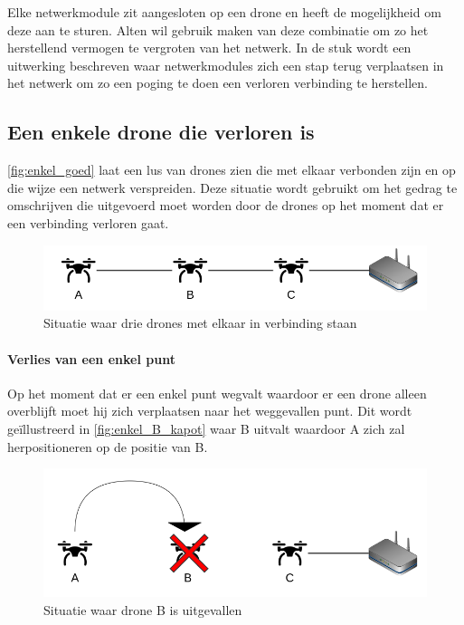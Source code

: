 \documentclass[a4paper, 11pt, oneside]{report}
\begin{document}
Elke netwerkmodule zit aangesloten op een drone en heeft de mogelijkheid om deze aan te sturen.
Alten wil gebruik maken van deze combinatie om zo het herstellend vermogen te vergroten van het netwerk.
In de stuk wordt een uitwerking beschreven waar netwerkmodules zich een stap terug verplaatsen in het netwerk om zo een poging te doen een verloren verbinding te herstellen.

\subsection{Een enkele drone die verloren is}\label{sec:een-enkele-drone-die-verloren-is}
\autoref{fig:enkel_goed} laat een lus van drones zien die met elkaar verbonden zijn en op die wijze een netwerk verspreiden. Deze situatie wordt gebruikt om het gedrag te omschrijven die uitgevoerd moet worden door de drones op het moment dat er een verbinding verloren gaat. 
\begin{figure}[H]
	\begin{center}\includegraphics[width=.85\linewidth]{Afbeeldingen/droneopstelling_enkel_goed.png}\end{center}
	\caption{Situatie waar drie drones met elkaar in verbinding staan}
	\label{fig:enkel_goed}
\end{figure} 

\paragraph{Verlies van een enkel punt}
Op het moment dat er een enkel punt wegvalt waardoor er een drone alleen overblijft moet hij zich verplaatsen naar het weggevallen punt. Dit wordt geïllustreerd in \autoref{fig:enkel_B_kapot} waar B uitvalt waardoor A zich zal herpositioneren op de positie van B. 
\begin{figure}[H]
	\begin{center}\includegraphics[width=.85\linewidth]{Afbeeldingen/droneopstelling_enkel_B_kapot.png}\end{center}
	\caption{Situatie waar drone B is uitgevallen}
	\label{fig:enkel_B_kapot}
\end{figure}
\end{document}
